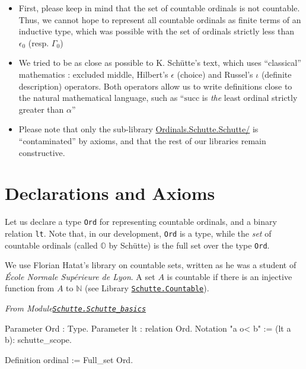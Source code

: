 \begin{itemize}
\item First, please keep in mind  that the set of countable ordinals is not countable. Thus, we cannot hope to represent all countable ordinals as finite terms of an inductive type, which was possible with  the set of ordinals strictly less than $\epsilon_0$ (resp. $\Gamma_0$)
\item We tried to be as close as possible to K. Schütte's text, which uses ``classical'' mathematics : excluded middle, Hilbert's $\epsilon$ (choice) and Russel's $\iota$ (definite description) operators. Both operators allow us to write definitions close to the natural mathematical language, such as ``$\textrm{succ}$ is \emph{the} least ordinal strictly greater than $\alpha$''
\item Please note that only the sub-library \href{../src/html/hydras.Schutte.Schutte.html}{Ordinals.Schutte.Schutte/} is ``contaminated'' by axioms, and that the rest of our libraries remain constructive.



\end{itemize}

\section{Declarations and Axioms}

Let us declare a type 
\texttt{Ord} for representing countable ordinals, and a binary relation
 \texttt{lt}. Note that, in our development, \texttt{Ord} is a type, while the \emph{set} of countable ordinals (called $\mathbb{O}$ by Schütte) 
is the full set over the type \texttt{Ord}.

\label{types:Ord} 

We use Florian Hatat's library on countable sets, written as he was a student of  \emph{\'Ecole Normale Supérieure de Lyon}. A set $A$ is countable if there is an injective function from $A$ to $\mathbb{N}$ (see 
Library \href{../src/html/hydras.Schutte.Countable.html}%
{\texttt{Schutte.Countable}}).


\vspace{6pt}

\emph{From Module\href{../src/html/hydras.Schutte.Schutte_basics.html}%
{\texttt{Schutte.Schutte\_basics}}}

\begin{Coqsrc}
Parameter Ord : Type.
Parameter lt : relation Ord.
Notation "a o< b" := (lt a b): schutte_scope.

Definition ordinal := Full_set Ord.
\end{Coqsrc}

